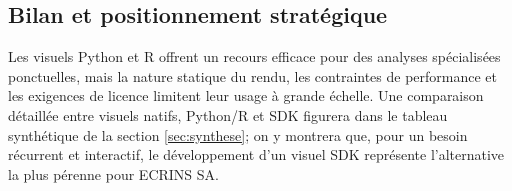 \subsection{Bilan et positionnement stratégique}

Les visuels Python et R offrent un recours efficace pour des analyses spécialisées ponctuelles, mais la nature statique du rendu, les contraintes de performance et les exigences de licence limitent leur usage à grande échelle.  
Une comparaison détaillée entre visuels natifs, Python/R et SDK figurera dans le tableau synthétique de la section \ref{sec:synthese}; on y montrera que, pour un besoin récurrent et interactif, le développement d’un visuel SDK représente l’alternative la plus pérenne pour ECRINS SA.
